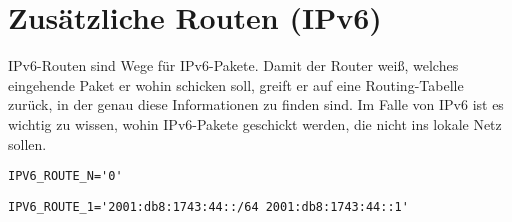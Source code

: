 \section{Zusätzliche Routen (IPv6)}

IPv6-Routen sind Wege für IPv6-Pakete. Damit der Router weiß, welches eingehende
Paket er wohin schicken soll, greift er auf eine Routing-Tabelle zurück, in der
genau diese Informationen zu finden sind. Im Falle von IPv6 ist es wichtig zu
wissen, wohin IPv6-Pakete geschickt werden, die nicht ins lokale Netz sollen.

\begin{description}
\verb*?IPV6_ROUTE_N='0'?

\verb*?IPV6_ROUTE_1='2001:db8:1743:44::/64 2001:db8:1743:44::1'?
\end{description}
